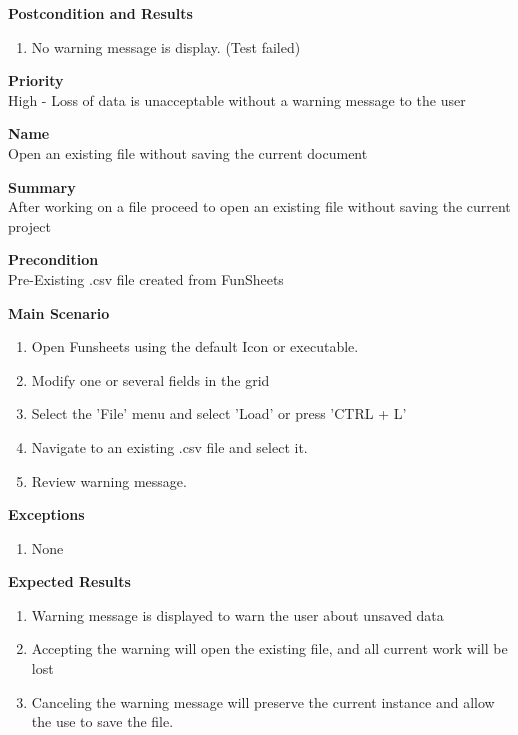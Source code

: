 \documentclass[12pt]{article}
\begin{document}
\noindent
{\bf Postcondition and Results}\
\begin{enumerate}
\item No warning message is display. (Test failed)
\end{enumerate}

\noindent
{\bf Priority}\\
High - Loss of data is unacceptable without a warning message to the user
\noindent

\clearpage


\noindent
{\bf Name}\\
Open an existing file without saving the current document

\noindent
{\bf Summary}\\
After working on a file proceed to open an existing file without saving the current project

\noindent
{\bf Precondition}\\
Pre-Existing .csv file created from FunSheets

\noindent
{\bf Main Scenario}\\
\vspace*{-0.2in}
\begin{enumerate}
\item Open Funsheets using the default Icon or executable.
\item Modify one or several fields in the grid
\item Select the 'File' menu and select 'Load' or press 'CTRL + L'
\item Navigate to an existing .csv file and select it.
\item Review warning message.
\end{enumerate}

{\bf Exceptions}\
\begin{enumerate}
\item None
\end{enumerate}

{\bf Expected Results}\
\begin{enumerate}
\item Warning message is displayed to warn the user about unsaved data
\item Accepting the warning will open the existing file, and all current work will be lost
\item Canceling the warning message will preserve the current instance and allow the use to save the file.
\end{enumerate}
\end{document}
